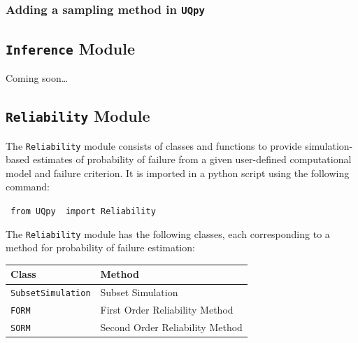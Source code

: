 



\subsubsection{Adding a sampling method in \texttt{UQpy}}


\subsection{\texttt{Inference} Module}

Coming soon\dots


\subsection{\texttt{Reliability} Module}

The \texttt{Reliability} module consists of classes and functions to provide simulation-based estimates of probability of failure from a given user-defined computational model and failure criterion. It is imported in a python script using the following command:

\vspace{4mm}
\texttt{{\color{blue} from} \texttt{UQpy} {\color{blue} import} Reliability }
\vspace{4mm}

\noindent
The \texttt{Reliability} module has the following classes, each corresponding to a method for probability of failure estimation:

\vspace{4mm}
\begin{center}
	\begin{tabular}{ |l|l| } 
		\hline
		\textbf{Class} &  \textbf{Method} \\
		\hline
		\texttt{SubsetSimulation}&  Subset Simulation  \\ 
		\hline
		\texttt{FORM}&  First Order Reliability Method  \\ 
		\hline
		\texttt{SORM}& Second Order Reliability Method  \\ 
		\hline
	\end{tabular}
\end{center}
\vspace{4mm}

